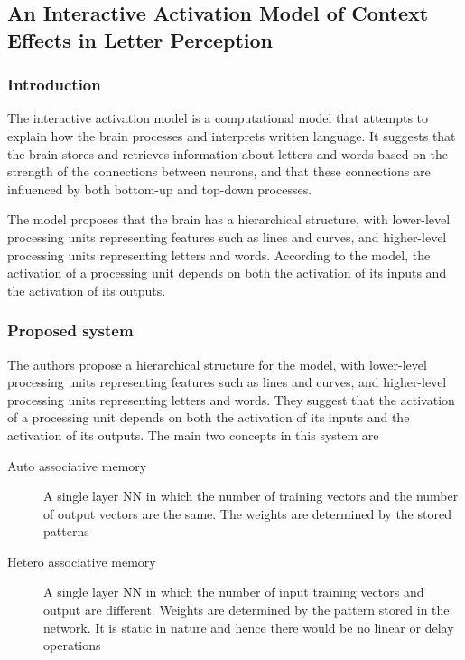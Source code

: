 \subsection{An Interactive Activation Model of Context Effects in Letter Perception}
\subsubsection{Introduction}
The interactive activation model\cite{auto} is a computational model that
attempts to explain how the brain processes and interprets written language. It
suggests that the brain stores and retrieves information about letters and
words based on the strength of the connections between neurons, and that these
connections are influenced by both bottom-up and top-down processes.

The model proposes that the brain has a hierarchical structure, with
lower-level processing units representing features such as lines and curves,
and higher-level processing units representing letters and words. According to
the model, the activation of a processing unit depends on both the activation
of its inputs and the activation of its outputs.
\subsubsection{Proposed system}
The authors propose a hierarchical structure for the model, with lower-level
processing units representing features such as lines and curves, and
higher-level processing units representing letters and words. They suggest that
the activation of a processing unit depends on both the activation of its
inputs and the activation of its outputs. The main two concepts in this system
are

\begin{description}
    \item[Auto associative memory]A single layer NN in which the number of training
    vectors and the number of output vectors are the same. The weights are
    determined by the stored patterns
    \item[Hetero associative memory]A single layer NN in which the number of input
    training vectors and output are different. Weights are determined by the
    pattern stored in the network. It is static in nature and hence there would be
    no linear or delay operations
\end{description}
